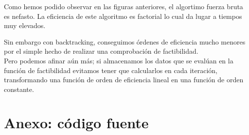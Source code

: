 \documentclass[12pt,spanish]{article}
\begin{document}
Como hemos podido observar en las figuras anteriores, el algortimo fuerza bruta es nefasto. La eficiencia de este algoritmo es factorial lo cual da lugar a tiempos muy elevados.

Sin embargo con backtracking, conseguimos órdenes de eficiencia mucho menores por el simple hecho de realizar una comprobación de factibilidad. \\

Pero podemos afinar aún más; si almacenamos los datos que se evalúan en la función de factibilidad evitamos tener que calcularlos en cada iteración, transformando una función de orden de eficiencia lineal en una función de orden constante.

\section{Anexo: código fuente}






\end{document}
